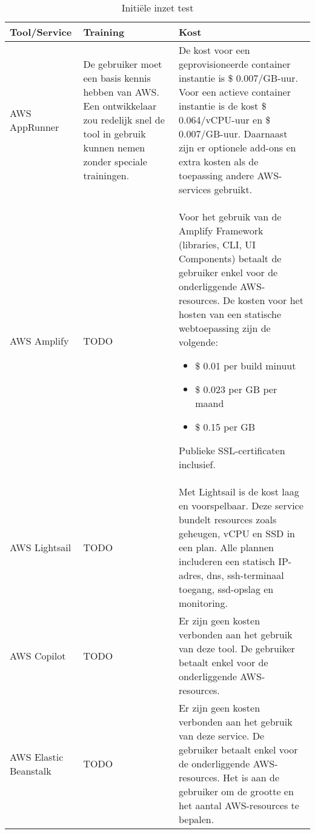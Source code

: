 \begin{table}[h]
    \label{tab:inzet-1}
    \begin{tabular}{  l p{5cm} p{5cm} }
        \toprule
        \textbf{Tool/Service} & \textbf{Training} & \textbf{Kost} \\\midrule
        AWS AppRunner &
            {\small
        De gebruiker moet een basis kennis hebben van AWS.
        Een ontwikkelaar zou redelijk snel de tool in gebruik kunnen nemen zonder speciale trainingen.
        } &
            {\small
        De kost voor een geprovisioneerde container instantie is \$ 0.007/GB-uur.
        Voor een actieve container instantie is de kost \$ 0.064/vCPU-uur en \$ 0.007/GB-uur.
        Daarnaast zijn er optionele add-ons en extra kosten als de toepassing andere AWS-services gebruikt.
        } \\\hline
        AWS Amplify &
            {\small
        TODO
        } &
            {\small
        Voor het gebruik van de Amplify Framework (libraries, CLI, UI Components) betaalt de gebruiker enkel voor de onderliggende AWS-resources.
        De kosten voor het hosten van een statische webtoepassing zijn de volgende:
        \begin{itemize}
            \item \$ 0.01 per build minuut
            \item \$ 0.023 per GB per maand
            \item \$ 0.15 per GB
        \end{itemize}
        Publieke SSL-certificaten inclusief.
        } \\\hline
        AWS Lightsail &
            {\small
        TODO
        } &
            {\small
        Met Lightsail is de kost laag en voorspelbaar.
        Deze service bundelt resources zoals geheugen, vCPU en SSD in een plan.
        Alle plannen includeren een statisch IP-adres, \acrshort{dns}, \acrshort{ssh}-terminaal toegang, \acrshort{ssd}-opslag en monitoring.
        } \\\hline
        AWS Copilot &
            {\small
        TODO
        } &
            {\small
        Er zijn geen kosten verbonden aan het gebruik van deze tool.
        De gebruiker betaalt enkel voor de onderliggende AWS-resources.
        } \\\hline
        AWS Elastic Beanstalk &
            {\small
        TODO
        } &
            {\small
        Er zijn geen kosten verbonden aan het gebruik van deze service.
        De gebruiker betaalt enkel voor de onderliggende AWS-resources.
        Het is aan de gebruiker om de grootte en het aantal AWS-resources te bepalen.
        } \\\hline
        \bottomrule
    \end{tabular}
    \caption{Initiële inzet test}
\end{table}

